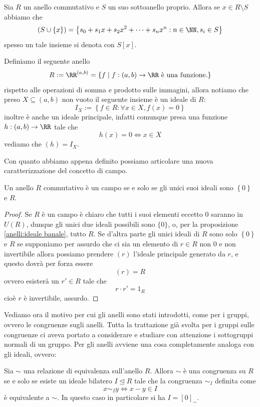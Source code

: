 \documentclass[11pt]{scrartcl}
\newcommand{\normal}{\mathrel{\unlhd}}
\begin{document}
	\begin{example}
		Sia $R$ un anello commutativo e $S$ un suo sottoanello proprio. Allora se $x\in R\setminus S$ abbiamo che
		$$\left(S\cup \left\{x\right\}\right)=\left\{s_0+s_1x+s_2x^2+\dots+s_nx^n:n\in\NN,s_i\in S\right\}$$
		spesso un tale insieme si denota con $S[x]$. 
	\end{example}
	\begin{example}
		Definiamo il seguente anello 
		$$R:=\RR^{(a,b)}=\left\{f\mid f:(a,b)\to \RR \text{ è una funzione.}\right\}$$
		rispetto alle operazioni di somma e prodotto sulle immagini, allora notiamo che preso $X\subseteq (a,b)$ non vuoto il seguente insieme è un ideale di $R$:
		$$I_X:=\left\{f\in R:\forall x\in X, f(x)=0\right\}$$
		inoltre è anche un ideale principale, infatti comunque presa una funzione $h:(a,b)\to \RR$ tale che 
		$$h(x)=0 \iff x\in X$$
		vediamo che $(h)=I_X$. 
	\end{example}
	Con quanto abbiamo appena definito possiamo articolare una nuova caratterizzazione del concetto di campo.
	\begin{proposition}
		Un anello $R$ commutativo è un campo se e solo se gli unici suoi ideali sono $\left\{0\right\}$ e $R$.
	\end{proposition}
	\begin{proof}
		Se $R$ è un campo è chiaro che tutti i suoi elementi eccetto $0$ saranno in $U(R)$, dunque gli unici due ideali possibili sono $\{0\}$, o, per la proposizione \ref{anelli:ideale banale}, tutto $R$. Se d'altra parte gli unici ideali di $R$ sono solo $\left\{0\right\}$ e $R$ se supponiamo per assurdo che ci sia un elemento di $r\in R$ non $0$ e non invertibile allora possiamo prendere $(r)$ l'ideale principale generato da $r$, e questo dovrà per forza essere
		$$(r)=R$$
		ovvero esisterà un $r'\in R$ tale che 
		$$r\cdot r'=1_R$$
		cioè $r$ è invertibile, assurdo.
	\end{proof}
	Vediamo ora il motivo per cui gli anelli sono stati introdotti, come per i gruppi, ovvero le congruenze sugli anelli. Tutta la trattazione già svolta per i gruppi sulle congruenze ci aveva portato a considerare e studiare con attenzione i sottogruppi normali di un gruppo. Per gli anelli avviene una cosa completamente analoga con gli ideali, ovvero:
	\begin{theorem}
		Sia $\sim$ una relazione di equivalenza sull'anello $R$. Allora $\sim$ è una congruenza su $R$ se e solo se esiste un ideale bilatero $I\normal R$ tale che la congruenza $\sim_I$ definita come
		$$x\sim_I y \iff x-y\in I$$
		è equivalente a $\sim$. In questo caso in particolare si ha $I=[0]_\sim$. 
	\end{theorem}
\end{document}
